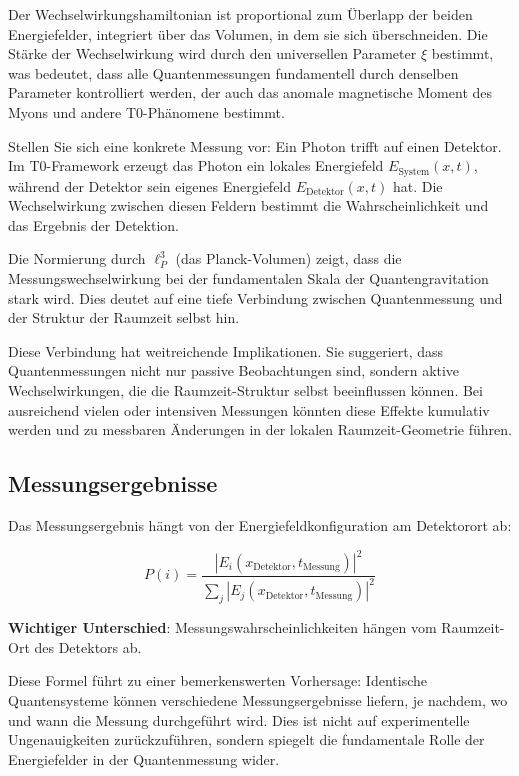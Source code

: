 \documentclass[12pt,a4paper]{article}
\newcommand{\xipar}{\xi}
\theoremstyle{definition}
\theoremstyle{remark}
\begin{document}
Der Wechselwirkungshamiltonian ist proportional zum Überlapp der beiden Energiefelder, integriert über das Volumen, in dem sie sich überschneiden. Die Stärke der Wechselwirkung wird durch den universellen Parameter $\xipar$ bestimmt, was bedeutet, dass alle Quantenmessungen fundamentell durch denselben Parameter kontrolliert werden, der auch das anomale magnetische Moment des Myons und andere T0-Phänomene bestimmt.

Stellen Sie sich eine konkrete Messung vor: Ein Photon trifft auf einen Detektor. Im T0-Framework erzeugt das Photon ein lokales Energiefeld $E_{\text{System}}(x,t)$, während der Detektor sein eigenes Energiefeld $E_{\text{Detektor}}(x,t)$ hat. Die Wechselwirkung zwischen diesen Feldern bestimmt die Wahrscheinlichkeit und das Ergebnis der Detektion.

Die Normierung durch $\ell_P^3$ (das Planck-Volumen) zeigt, dass die Messungswechselwirkung bei der fundamentalen Skala der Quantengravitation stark wird. Dies deutet auf eine tiefe Verbindung zwischen Quantenmessung und der Struktur der Raumzeit selbst hin.

Diese Verbindung hat weitreichende Implikationen. Sie suggeriert, dass Quantenmessungen nicht nur passive Beobachtungen sind, sondern aktive Wechselwirkungen, die die Raumzeit-Struktur selbst beeinflussen können. Bei ausreichend vielen oder intensiven Messungen könnten diese Effekte kumulativ werden und zu messbaren Änderungen in der lokalen Raumzeit-Geometrie führen.

\subsection{Messungsergebnisse}

Das Messungsergebnis hängt von der Energiefeldkonfiguration am Detektorort ab:

\begin{equation}
	P(i) = \frac{|E_i(x_{\text{Detektor}}, t_{\text{Messung}})|^2}{\sum_j |E_j(x_{\text{Detektor}}, t_{\text{Messung}})|^2}
	\label{eq:measurement_probability}
\end{equation}

\textbf{Wichtiger Unterschied}: Messungswahrscheinlichkeiten hängen vom Raumzeit-Ort des Detektors ab.

Diese Formel führt zu einer bemerkenswerten Vorhersage: Identische Quantensysteme können verschiedene Messungsergebnisse liefern, je nachdem, wo und wann die Messung durchgeführt wird. Dies ist nicht auf experimentelle Ungenauigkeiten zurückzuführen, sondern spiegelt die fundamentale Rolle der Energiefelder in der Quantenmessung wider.
\end{document}
